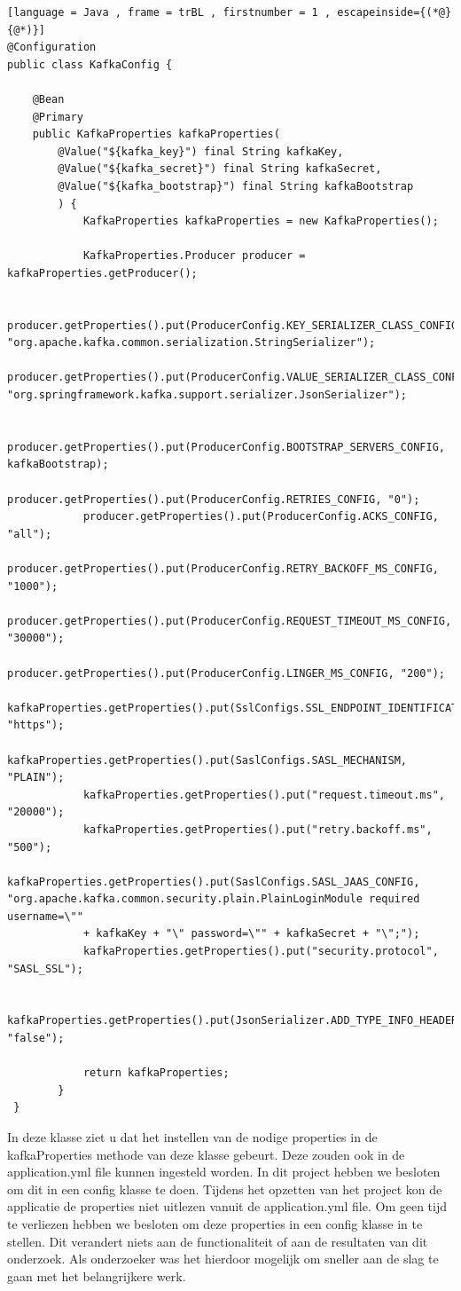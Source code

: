 \begin{lstlisting}[language = Java , frame = trBL , firstnumber = 1 , escapeinside={(*@}{@*)}]
@Configuration
public class KafkaConfig {

    @Bean
    @Primary
    public KafkaProperties kafkaProperties(
        @Value("${kafka_key}") final String kafkaKey,
        @Value("${kafka_secret}") final String kafkaSecret,
        @Value("${kafka_bootstrap}") final String kafkaBootstrap
        ) {
            KafkaProperties kafkaProperties = new KafkaProperties();

            KafkaProperties.Producer producer = kafkaProperties.getProducer();

            producer.getProperties().put(ProducerConfig.KEY_SERIALIZER_CLASS_CONFIG, "org.apache.kafka.common.serialization.StringSerializer");
            producer.getProperties().put(ProducerConfig.VALUE_SERIALIZER_CLASS_CONFIG, "org.springframework.kafka.support.serializer.JsonSerializer");

            producer.getProperties().put(ProducerConfig.BOOTSTRAP_SERVERS_CONFIG, kafkaBootstrap);
            producer.getProperties().put(ProducerConfig.RETRIES_CONFIG, "0");
            producer.getProperties().put(ProducerConfig.ACKS_CONFIG, "all");
            producer.getProperties().put(ProducerConfig.RETRY_BACKOFF_MS_CONFIG, "1000");
            producer.getProperties().put(ProducerConfig.REQUEST_TIMEOUT_MS_CONFIG, "30000");
            producer.getProperties().put(ProducerConfig.LINGER_MS_CONFIG, "200");
            kafkaProperties.getProperties().put(SslConfigs.SSL_ENDPOINT_IDENTIFICATION_ALGORITHM_CONFIG, "https");
            kafkaProperties.getProperties().put(SaslConfigs.SASL_MECHANISM, "PLAIN");
            kafkaProperties.getProperties().put("request.timeout.ms", "20000");
            kafkaProperties.getProperties().put("retry.backoff.ms", "500");
            kafkaProperties.getProperties().put(SaslConfigs.SASL_JAAS_CONFIG, "org.apache.kafka.common.security.plain.PlainLoginModule required username=\""
            + kafkaKey + "\" password=\"" + kafkaSecret + "\";");
            kafkaProperties.getProperties().put("security.protocol", "SASL_SSL");

            kafkaProperties.getProperties().put(JsonSerializer.ADD_TYPE_INFO_HEADERS, "false");

            return kafkaProperties;
        }
 }
\end{lstlisting}

In deze klasse ziet u dat het instellen van de nodige properties in de kafkaProperties methode van deze klasse gebeurt. Deze zouden ook in de application.yml file kunnen ingesteld worden. In dit project hebben we besloten om dit in een config klasse te doen. Tijdens het opzetten van het project kon de applicatie de properties niet uitlezen vanuit de application.yml file. Om geen tijd te verliezen hebben we besloten om deze properties in een config klasse in te stellen. Dit verandert niets aan de functionaliteit of aan de resultaten van dit onderzoek. Als onderzoeker was het hierdoor mogelijk om sneller aan de slag te gaan met het belangrijkere werk.

